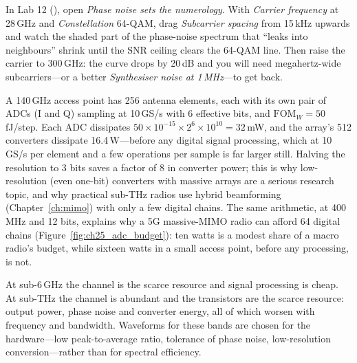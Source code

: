 \begin{tryit}
In Lab 12 (), open \emph{Phase noise sets the numerology}. With
\emph{Carrier frequency} at 28\,GHz and \emph{Constellation} 64-QAM, drag \emph{Subcarrier spacing}
from 15\,kHz upwards and watch the shaded part of the phase-noise spectrum that ``leaks into
neighbours'' shrink until the SNR ceiling clears the 64-QAM line. Then raise the carrier to 300\,GHz:
the curve drops by 20\,dB and you will need megahertz-wide subcarriers---or a better
\emph{Synthesiser noise at 1\,MHz}---to get back.
\end{tryit}


\begin{worked}
A 140\,GHz access point has 256 antenna elements, each with its own pair of ADCs (I and Q) sampling at
10\,GS/s with 6 effective bits, and $\mathrm{FOM}_W=50$\,fJ/step. Each ADC dissipates
$50\times10^{-15}\times2^6\times10^{10}=32$\,mW, and the array's 512 converters dissipate 16.4\,W---before
any digital signal processing, which at 10\,GS/s per element and a few operations per sample is far
larger still. Halving the resolution to 3 bits saves a factor of 8 in converter power; this is why
low-resolution (even one-bit) converters with massive arrays are a serious research topic, and why
practical sub-THz radios use hybrid beamforming (Chapter~\ref{ch:mimo}) with only a few digital
chains. The same arithmetic, at 400\,MHz and 12 bits, explains why a 5G massive-MIMO radio can afford
64 digital chains (Figure~\ref{fig:ch25_adc_budget}): ten watts is a modest share of a macro radio's
budget, while sixteen watts in a small access point, before any processing, is not.
\end{worked}

\begin{keyidea}
At sub-6\,GHz the channel is the scarce resource and signal processing is cheap. At sub-THz the channel
is abundant and the transistors are the scarce resource: output power, phase noise and converter
energy, all of which worsen with frequency and bandwidth. Waveforms for these bands are chosen for
the hardware---low peak-to-average ratio, tolerance of phase noise, low-resolution conversion---rather
than for spectral efficiency.
\end{keyidea}

